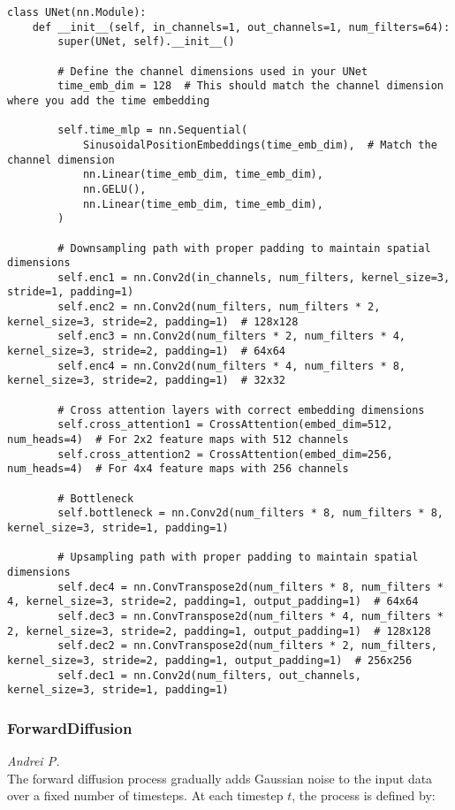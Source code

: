 \begin{lstlisting}[basicstyle=\tiny]
class UNet(nn.Module):
    def __init__(self, in_channels=1, out_channels=1, num_filters=64):
        super(UNet, self).__init__()

        # Define the channel dimensions used in your UNet
        time_emb_dim = 128  # This should match the channel dimension where you add the time embedding
        
        self.time_mlp = nn.Sequential(
            SinusoidalPositionEmbeddings(time_emb_dim),  # Match the channel dimension
            nn.Linear(time_emb_dim, time_emb_dim),
            nn.GELU(),
            nn.Linear(time_emb_dim, time_emb_dim),
        )

        # Downsampling path with proper padding to maintain spatial dimensions
        self.enc1 = nn.Conv2d(in_channels, num_filters, kernel_size=3, stride=1, padding=1)
        self.enc2 = nn.Conv2d(num_filters, num_filters * 2, kernel_size=3, stride=2, padding=1)  # 128x128
        self.enc3 = nn.Conv2d(num_filters * 2, num_filters * 4, kernel_size=3, stride=2, padding=1)  # 64x64
        self.enc4 = nn.Conv2d(num_filters * 4, num_filters * 8, kernel_size=3, stride=2, padding=1)  # 32x32

        # Cross attention layers with correct embedding dimensions
        self.cross_attention1 = CrossAttention(embed_dim=512, num_heads=4)  # For 2x2 feature maps with 512 channels
        self.cross_attention2 = CrossAttention(embed_dim=256, num_heads=4)  # For 4x4 feature maps with 256 channels

        # Bottleneck
        self.bottleneck = nn.Conv2d(num_filters * 8, num_filters * 8, kernel_size=3, stride=1, padding=1)

        # Upsampling path with proper padding to maintain spatial dimensions
        self.dec4 = nn.ConvTranspose2d(num_filters * 8, num_filters * 4, kernel_size=3, stride=2, padding=1, output_padding=1)  # 64x64
        self.dec3 = nn.ConvTranspose2d(num_filters * 4, num_filters * 2, kernel_size=3, stride=2, padding=1, output_padding=1)  # 128x128
        self.dec2 = nn.ConvTranspose2d(num_filters * 2, num_filters, kernel_size=3, stride=2, padding=1, output_padding=1)  # 256x256
        self.dec1 = nn.Conv2d(num_filters, out_channels, kernel_size=3, stride=1, padding=1)

\end{lstlisting}

\subsubsection{ForwardDiffusion}
\textit{Andrei P.}\\
The forward diffusion process gradually adds Gaussian noise to the input data over a fixed number of timesteps. At each timestep $t$, the process is defined by:

